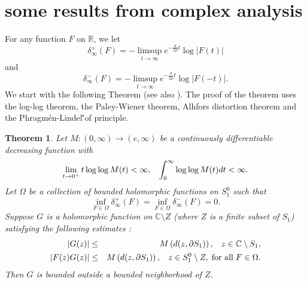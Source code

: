\documentclass[11pt,reqno]{amsart}
\newcommand{\R}{\mathbb R}%
\newtheorem{theorem}{Theorem}[section]
\theoremstyle{definition}
\theoremstyle{definition}
\numberwithin{equation}{section}
\begin{document}
\section{some results from complex analysis}
For any function $F$ on $\R$, we let $$\delta_\infty^+(F)=-\limsup_{t\rightarrow\infty} e^{-\frac{\pi}{2\rho}t}\log|F(t)|$$ and $$\delta_\infty^-(F)=-\limsup_{t\rightarrow\infty} e^{-\frac{\pi}{2\rho}t}\log|F(-t)|.$$
We start with the following Theorem \cite[Theorem 6.8]{Dah} (see also \cite{Hedenmalm-1985}). The proof of the theorem uses the log-log theorem, the Paley-Wiener theorem, Alhfors distortion theorem and the Phragm\'{e}n-Lindel\''{o}f principle. 
\begin{theorem}
Let $M:(0,\infty)\rightarrow (e,\infty)$ be a continuously differentiable decreasing function with 
$$
\lim_{t\rightarrow 0^+}t\log\log M(t)<\infty,\hspace{3mm}\int_0^\infty\log\log M(t)dt<\infty.
$$
Let $\Omega$ be a collection of bounded holomorphic functions on $ S_1^0$ such that 
$$
\inf_{F\in \Omega}\delta^+_\infty(F)=\inf_{F\in \Omega}\delta^-_\infty(F)=0.
$$
Suppose $G$ is a holomorphic function on $\mathbb{C}\setminus Z$ (where $Z$ is a finite subset of $ S_1$) satisfying the following estimates :
\begin{eqnarray*}
|G(z)|&\leq & M\left(d(z,\partial S_1)\right),
\hspace{3mm}z\in\mathbb{C}\setminus S_1,\\
|F(z)G(z)|&\leq & M\left(d(z,\partial S_1)\right),
\hspace{3mm}z\in S_1^0\setminus Z,
\hspace{1mm}\textup{for all}\hspace{1mm}F\in \Omega.
\end{eqnarray*}
Then $G$ is bounded outside a bounded neighborhood of $Z$. 
\end{theorem}
\end{document}
